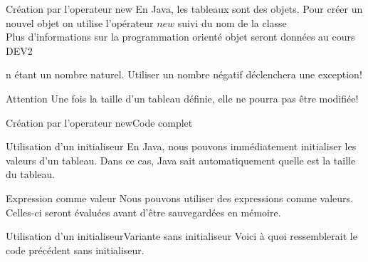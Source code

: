 \begin{frame}{Création par l'operateur new}
    \pause
    En Java, les tableaux sont des objets. Pour créer un nouvel objet on utilise l'opérateur $new$ suivi du nom de la classe\\
    \tiny Plus d'informations sur la programmation orienté objet seront données au cours DEV2 \normalsize

    
    n étant un nombre naturel. Utiliser un nombre négatif déclenchera une exception!

    \pause
    \begin{alertblock}{Attention}
        Une fois la taille d'un tableau d\'efinie, elle ne pourra pas être modifiée!
    \end{alertblock}
\end{frame}

\begin{frame}{Création par l'operateur new}{Code complet}
    
\end{frame}

\begin{frame}{Utilisation d'un initialiseur}
    \pause
    En Java, nous pouvons immédiatement initialiser les valeurs d'un tableau.
    Dans ce cas, Java sait automatiquement quelle est la taille du tableau.
    

    \pause
    \begin{exampleblock}{Expression comme valeur}
        Nous pouvons utiliser des expressions comme valeurs.
        Celles-ci seront évaluées avant d'être sauvegardées en mémoire.
    \end{exampleblock}

\end{frame}

\begin{frame}{Utilisation d'un initialiseur}{Variante sans initialiseur}
    Voici à quoi ressemblerait le code précédent sans initialiseur.
    
\end{frame}